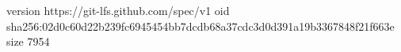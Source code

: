 version https://git-lfs.github.com/spec/v1
oid sha256:02d0c60d22b239fc6945454bb7dcdb68a37cdc3d0d391a19b3367848f21f663e
size 7954
